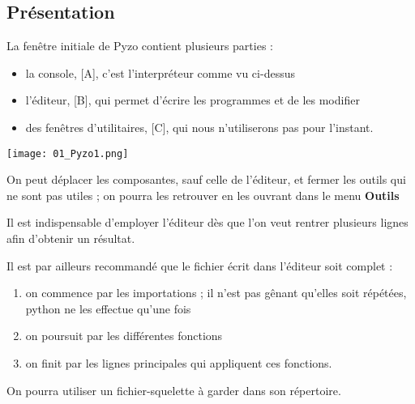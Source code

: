 \subsection{Présentation}
La fenêtre initiale de Pyzo contient plusieurs parties :
\begin{itemize}
\item la console, [A], c'est l'interpréteur comme vu ci-dessus
\item l'éditeur, [B], qui permet d'écrire les programmes et de les modifier
\item des fenêtres d'utilitaires, [C], qui nous n'utiliserons pas pour l'instant.
\end{itemize}

\begin{center}
\texttt{[image: 01\_Pyzo1.png]} 
\end{center}
On peut déplacer les composantes, sauf celle de l'éditeur, et fermer les outils qui ne sont pas utiles ; on pourra les retrouver en les ouvrant dans le menu {\bf Outils}

Il est indispensable d'employer l'éditeur dès que l'on veut rentrer plusieurs lignes afin d'obtenir un résultat.               

Il est par ailleurs recommandé que le fichier écrit dans l'éditeur soit complet :
\begin{enumerate}
\item on commence par les importations ; il n'est pas gênant qu'elles soit répétées, python ne les effectue qu'une fois

\item on poursuit par les différentes fonctions 

\item on finit par les lignes principales qui appliquent ces fonctions.

\end{enumerate}
On pourra utiliser un fichier-squelette à garder dans son répertoire.

